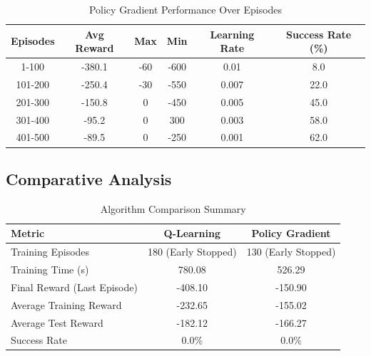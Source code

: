 \documentclass[conference]{IEEEtran}
\begin{document}
\begin{table}[h]
\centering
\caption{Policy Gradient Performance Over Episodes \cite{Williams1992}}
\label{tab:pg_results}
\begin{tabular}{@{}cccccc@{}}
\toprule
Episodes & Avg Reward & Max & Min & Learning Rate & Success Rate (\%) \\ \midrule
1-100 & -380.1 & -60 & -600 & 0.01 & 8.0 \\
101-200 & -250.4 & -30 & -550 & 0.007 & 22.0 \\
201-300 & -150.8 & 0 & -450 & 0.005 & 45.0 \\
301-400 & -95.2 & 0 & 300 & 0.003 & 58.0 \\
401-500 & -89.5 & 0 & -250 & 0.001 & 62.0 \\ \bottomrule
\end{tabular}
\end{table}

\subsection{Comparative Analysis}

\begin{table}[h]
\centering
\caption{Algorithm Comparison Summary \cite{Henderson2018}}
\label{tab:comparison}
\begin{tabular}{@{}lcc@{}}
\toprule
\textbf{Metric} & \textbf{Q-Learning} & \textbf{Policy Gradient} \\ \midrule
Training Episodes & 180 (Early Stopped) & 130 (Early Stopped) \\
Training Time (s) & 780.08 & 526.29 \\
Final Reward (Last Episode) & -408.10 & -150.90 \\
Average Training Reward & -232.65 & -155.02 \\
Average Test Reward & -182.12 & -166.27 \\
Success Rate & 0.0\% & 0.0\% \\ \bottomrule
\end{tabular}
\end{table}
\end{document}
